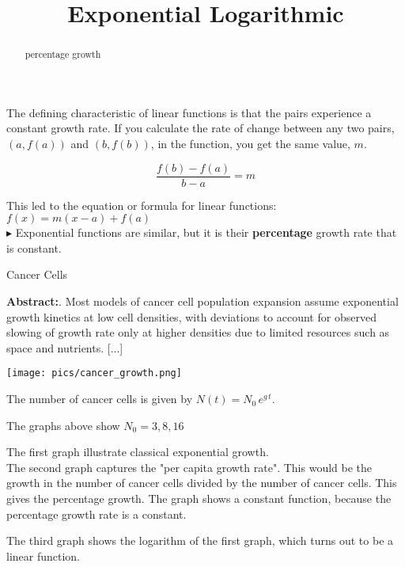 \documentclass{ximera}
\title{Exponential Logarithmic}
\begin{document}
\begin{abstract}
percentage growth
\end{abstract}
\maketitle




The defining characteristic of linear functions is that the pairs experience a constant growth rate. If you calculate the rate of change between any two pairs, $(a, f(a))$ and $(b, f(b))$, in the function, you get the same value, $m$.


\[   \frac{f(b)-f(a)}{b-a} = m       \]

This led to the equation or formula for linear functions:  $f(x) = m(x-a) + f(a)$ \\





$\blacktriangleright$ Exponential functions are similar, but it is their \textbf{percentage} growth rate that is constant.   \\


\begin{example} Cancer Cells 


\textbf{Abstract:}. Most models of cancer cell population expansion assume exponential growth kinetics at low cell densities, with deviations to account for observed slowing of growth rate only at higher densities due to limited resources such as space and nutrients. [...] \\


\begin{image}
\texttt{[image: pics/cancer\_growth.png]}
\end{image}


The number of cancer cells is given by $N(t) = N_0 \, e^{g \, t}$.

The graphs above show $N_0 = 3, 8, 16$

The first graph illustrate classical exponential growth.  \\

The second graph captures the "per capita growth rate".  This would be the growth in the number of cancer cells divided by the number of cancer cells. This gives the percentage growth.  The graph shows a constant function, because the percentage growth rate is a constant.

The third graph shows the logarithm of the first graph, which turns out to be a linear function.



\end{example}
\end{document}
